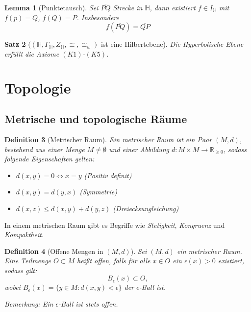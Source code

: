 \documentclass[a4paper,12pt]{article}
\theoremstyle{break}
\newtheorem{definition}{Definition}[section]
\newtheorem{theorem}[definition]{Satz}
\newtheorem{lemma}[definition]{Lemma}
\begin{document}
\begin{lemma}[Punktetausch]
    Sei $\overline{PQ}$ Strecke in $\mathbb{H}$, dann existiert $f\in I_\mathbb{H}$ mit $f(p)=Q$, $f(Q)=P$. Insbesondere $$f(\overline{PQ}) = \overline{QP}$$
\end{lemma}

\begin{theorem}[$(\mathbb{H}, \Gamma_\mathbb{H}, Z_\mathbb{H}, \cong, \cong_w)$ ist eine Hilbertebene]
    Die Hyperbolische Ebene erfüllt die Axiome $(K1)$-$(K5)$.
\end{theorem}

\section{Topologie} %

\subsection{Metrische und topologische Räume} %

\begin{definition}[Metrischer Raum]
Ein \emph{metrischer Raum} ist ein Paar $(M, d)$, bestehend aus einer Menge $M \neq \emptyset$ und einer Abbildung $d: M \times M \to \mathbb{R}_{\geq 0}$, sodass folgende Eigenschaften gelten:
\begin{itemize}
    \item[(i)] $d(x, y) = 0 \iff x = y$ \hfill (Positiv definit)
    \item[(ii)] $d(x, y) = d(y, x)$ \hfill (Symmetrie)
    \item[(iii)] $d(x, z) \leq d(x, y) + d(y, z)$ \hfill (Dreiecksungleichung)
\end{itemize}
\end{definition}

In einem metrischen Raum gibt es Begriffe wie \emph{Stetigkeit}, \emph{Kongruenz} und \emph{Kompaktheit}.

\begin{definition}[Offene Mengen in $(M, d)$]
Sei $(M, d)$ ein metrischer Raum. Eine Teilmenge $O \subset M$ heißt \emph{offen}, falls für alle $x \in O$ ein $\epsilon(x) > 0$ existiert, sodass gilt:
\[
B_{\epsilon}(x) \subset O,
\]
wobei $B_{\epsilon}(x) = \{y \in M : d(x, y) < \epsilon\}$ der \emph{$\epsilon$-Ball} ist. 

Bemerkung: Ein $\epsilon$-Ball ist stets offen.
\end{definition}
\end{document}
